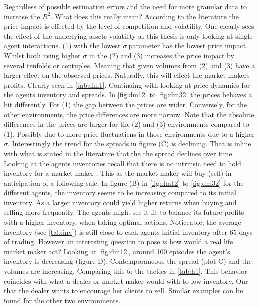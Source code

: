 \documentclass{kththesis}
\theoremstyle{definition}
\begin{document}
 \newpage
 Regardless of possible estimation errors and the need for more granular data to increase the $R^{2}$. What does this really mean? According to the literature \parencite{cartea2015algorithmic, foucault2013market} the price impact is effected by the level of competition and volatility. One clearly sees the effect of the underlying assets volatility as this thesis is only looking at single agent interactions. (1) with the lowest $\sigma$ parameter has the lowest price impact. Whilst both using higher $\sigma$ in the (2) and (3) increases the price impact by several tenfolds or centuples. Meaning that given volumes from (2) and (3) have a larger effect on the observed prices. Naturally, this will effect the market makers profits. Clearly seen in \autoref{tab:dm1}.  
\newline
\newline
Continuing with looking at price dynamics for the agents inventory and spreads.  In \autoref{fig:dm12} to \autoref{fig:dm32} the prices behaves a bit differently. For (1) the gap between the prices are wider. Conversely, for the other environments, the price differences are more narrow. Note that the absolute differences in the prices are larger for the (2) and (3) environments compared to (1). Possibly due to more price fluctuations in those environments due to a higher $\sigma$. Interestingly the trend for the spreads in figure (C) is declining. That is inline with what is stated in the literature \parencite{bouchaud2018trades, hasbrouck2007empirical, madhavan2000market} that the the spread declines over time. Looking at the agents inventories recall that there is no intrinsic need to hold inventory for a market maker \parencite{cartea2015algorithmic}. This as the market maker will buy (sell) in anticipation of a following sale. In figure (B) in \autoref{fig:dm12} to \autoref{fig:dm32} for the different agents, the inventory seems to be increasing compared to its initial inventory. 
\newline
\newline
As a larger inventory could yield higher returns when buying and selling more frequently. The agents might see it fit to balance its future profits with a higher inventory, when taking optimal actions. 
Noticeable, the average inventory (see \autoref{tab:inv}) is still close to each agents initial inventory after 65 days of trading. However an interesting question to pose is how would a real life market maker act? Looking at \autoref{fig:dm12}, around 100 episodes the agent's inventory is decreasing (figure D). Contemporaneous the spread (plot C) and the volumes are increasing. Comparing this to the tactics in \autoref{tab:h1}. This behavior coincides with what a dealer or market maker would with to low inventory. Our that the dealer wants to encourage her clients to sell. Similar examples can be found for the other two environments. 
\end{document}
